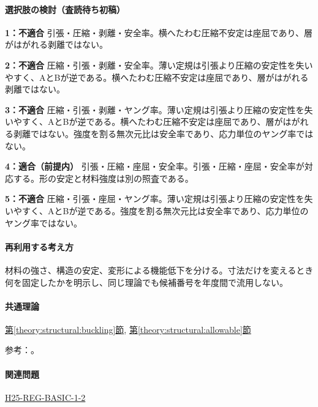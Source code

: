 \paragraph{選択肢の検討（査読待ち初稿）}\mbox{}\par

\noindent\textbf{1：不適合} 引張・圧縮・剥離・安全率。横へたわむ圧縮不安定は座屈であり、層がはがれる剥離ではない。\par

\noindent\textbf{2：不適合} 圧縮・引張・剥離・安全率。薄い定規は引張より圧縮の安定性を失いやすく、AとBが逆である。横へたわむ圧縮不安定は座屈であり、層がはがれる剥離ではない。\par

\noindent\textbf{3：不適合} 圧縮・引張・剥離・ヤング率。薄い定規は引張より圧縮の安定性を失いやすく、AとBが逆である。横へたわむ圧縮不安定は座屈であり、層がはがれる剥離ではない。強度を割る無次元比は安全率であり、応力単位のヤング率ではない。\par

\noindent\textbf{4：適合（前提内）} 引張・圧縮・座屈・安全率。引張・圧縮・座屈・安全率が対応する。形の安定と材料強度は別の照査である。\par

\noindent\textbf{5：不適合} 圧縮・引張・座屈・ヤング率。薄い定規は引張より圧縮の安定性を失いやすく、AとBが逆である。強度を割る無次元比は安全率であり、応力単位のヤング率ではない。\par

\paragraph{再利用する考え方} 材料の強さ、構造の安定、変形による機能低下を分ける。寸法だけを変えるとき何を固定したかを明示し、同じ理論でも候補番号を年度間で流用しない。

\paragraph{共通理論} \hyperref[theory:structural:buckling]{第\ref*{theory:structural:buckling}節}, \hyperref[theory:structural:allowable]{第\ref*{theory:structural:allowable}節}

\par 参考：\cite{struct_mit_beam,struct_mit_buckling,struct_mlit_limit}。

\paragraph{関連問題} \hyperref[q:h25-reg-basic-1-2]{H25-REG-BASIC-1-2}

